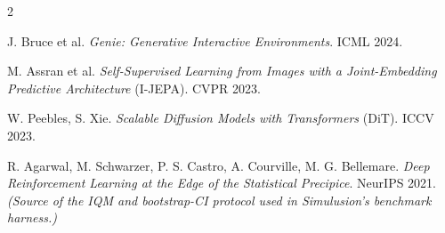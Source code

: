 \documentclass[10pt,a4paper]{article}
\begin{document}
{\begin{multicols}{2}
\begin{enumerate}[leftmargin=5.5mm,itemsep=0.8mm,label={\color{muted}[\arabic*]}]
  \item J. Bruce et al. \emph{Genie: Generative Interactive Environments}. ICML 2024.
  \item M. Assran et al. \emph{Self-Supervised Learning from Images with a Joint-Embedding Predictive Architecture} (I-JEPA). CVPR 2023.
  \item W. Peebles, S. Xie. \emph{Scalable Diffusion Models with Transformers} (DiT). ICCV 2023.
  \item R. Agarwal, M. Schwarzer, P. S. Castro, A. Courville, M. G. Bellemare. \emph{Deep Reinforcement Learning at the Edge of the Statistical Precipice}. NeurIPS 2021. \emph{(Source of the IQM and bootstrap-CI protocol used in Simulusion's benchmark harness.)}
\end{enumerate}
\end{multicols}}
\end{document}
